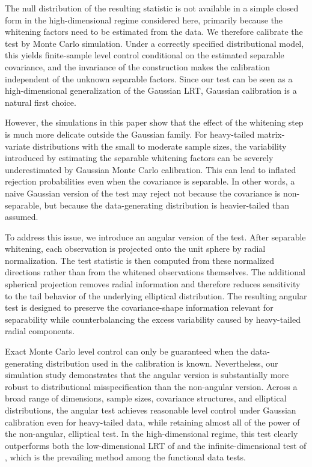 \documentclass[12pt]{article}
\begin{document}
The null distribution of the resulting statistic is not available in a simple closed form in the high-dimensional regime considered here, primarily because the whitening factors need to be estimated from the data. We therefore calibrate the test by Monte Carlo simulation. Under a correctly specified distributional model, this yields finite-sample level control conditional on the estimated separable covariance, and the invariance of the construction makes the calibration independent of the unknown separable factors. Since our test can be seen as a high-dimensional generalization of the Gaussian LRT, Gaussian calibration is a natural first choice.

However, the simulations in this paper show that the effect of the whitening step is much more delicate outside the Gaussian family. For heavy-tailed matrix-variate distributions with the small to moderate sample sizes, the variability introduced by estimating the separable whitening factors can be severely underestimated by Gaussian Monte Carlo calibration. This can lead to inflated rejection probabilities even when the covariance is separable. In other words, a naive Gaussian version of the test may reject not because the covariance is non-separable, but because the data-generating distribution is heavier-tailed than assumed.

To address this issue, we introduce an angular version of the test. After separable whitening, each observation is projected onto the unit sphere by radial normalization. The test statistic is then computed from these normalized directions rather than from the whitened observations themselves. The additional spherical projection removes radial information and therefore reduces sensitivity to the tail behavior of the underlying elliptical distribution.
The resulting angular test is designed to preserve the covariance-shape information relevant for separability while counterbalancing the excess variability caused by heavy-tailed radial components.

Exact Monte Carlo level control can only be guaranteed when the data-generating distribution used in the calibration is known. Nevertheless, our simulation study demonstrates that the angular version is substantially more robust to distributional misspecification than the non-angular version. Across a broad range of dimensions, sample sizes, covariance structures, and elliptical distributions, the angular test achieves reasonable level control under Gaussian calibration even for heavy-tailed data, while retaining almost all of the power of the non-angular, elliptical test. In the high-dimensional regime, this test clearly outperforms both the low-dimensional LRT of \citet{MITCHELL2006} and the infinite-dimensional test of \citet{aston2017tests}, which is the prevailing method among the functional data tests.
\end{document}
